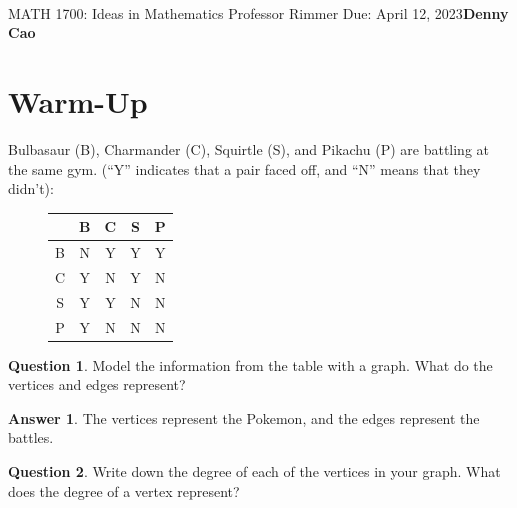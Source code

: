 \documentclass[article, 12pt]{article}
\title{\Large\bf{\psetName}}
\makeatletter
\theoremstyle{definition}
\newcommand{\courseNumber}{MATH 1700}
\newcommand{\courseName}{Ideas in Mathematics}
\newcommand{\professor}{Professor Rimmer}
\newcommand{\dueDate}{Due: April 12, 2023}
\newcommand{\name}{Denny Cao}
\newtheorem{question}{Question}
\newtheorem{answer}{Answer}
\renewcommand{\maketitle}{\bgroup\setlength{\parindent}{0pt}
    \begin{flushleft}
        \textbf{\@title} \\ \vskip0.2cm
        \begingroup
            \fontsize{14pt}{12pt}\selectfont
            \courseNumber: \courseName 
            \vskip0.3cm 
            \professor
        \endgroup \vskip0.3cm
        \dueDate \hfill\rlap{}\bf{\name} \\ \vskip0.1cm
        \hrulefill
    \end{flushleft}\egroup 
}
\makeatother
\begin{document}
    \maketitle
    \thispagestyle{plain}
    \section{Warm-Up}
    Bulbasaur (B), Charmander (C), Squirtle (S), and Pikachu (P) are battling at the same gym. (``Y'' indicates that a pair faced off, and ``N'' means that they didn't):
    \begin{figure}[H]
        \centering
        \begin{tabular}{|c|c|c|c|c|}
            \hline
              & B & C & S & P \\
            \hline
            B & N & Y & Y & Y \\
            C & Y & N & Y & N \\
            S & Y & Y & N & N \\
            P & Y & N & N & N \\
            \hline
        \end{tabular}
    \end{figure}
    \begin{question}
        Model the information from the table with a graph. What do the vertices and edges represent?
    \end{question}
    \begin{answer} The vertices represent the Pokemon, and the edges represent the battles. 
        \begin{figure}[H]
            \centering
        \end{figure}
    \end{answer}
    \begin{question}
        Write down the degree of each of the vertices in your graph. What does the degree of a vertex represent?
    \end{question}
\end{document}
